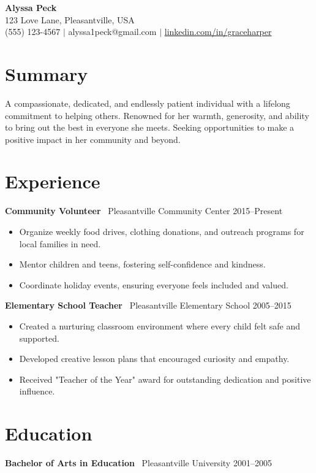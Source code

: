 \documentclass[11pt,a4paper]{article}
\begin{document}
\begin{center}
    {\LARGE\bfseries Alyssa Peck} \\[2pt]
    123 Love Lane, Pleasantville, USA \\[2pt]
    (555) 123-4567 $\vert$ alyssa1peck@gmail.com $\vert$ \href{https://linkedin.com/in/graceharper}{linkedin.com/in/graceharper}
\end{center}

\section*{Summary}
A compassionate, dedicated, and endlessly patient individual with a lifelong commitment to helping others. Renowned for her warmth, generosity, and ability to bring out the best in everyone she meets. Seeking opportunities to make a positive impact in her community and beyond.

\section*{Experience}
\textbf{Community Volunteer} \
Pleasantville Community Center \hfill 2015--Present
\begin{itemize}[leftmargin=*]
    \item Organize weekly food drives, clothing donations, and outreach programs for local families in need.
    \item Mentor children and teens, fostering self-confidence and kindness.
    \item Coordinate holiday events, ensuring everyone feels included and valued.
\end{itemize}

\textbf{Elementary School Teacher} \
Pleasantville Elementary School \hfill 2005--2015
\begin{itemize}[leftmargin=*]
    \item Created a nurturing classroom environment where every child felt safe and supported.
    \item Developed creative lesson plans that encouraged curiosity and empathy.
    \item Received "Teacher of the Year" award for outstanding dedication and positive influence.
\end{itemize}

\section*{Education}
\textbf{Bachelor of Arts in Education} \
Pleasantville University \hfill 2001--2005
\end{document}
